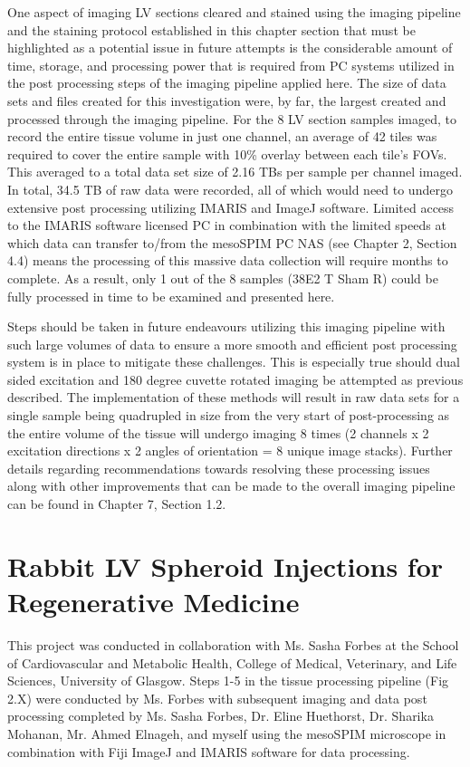 One aspect of imaging LV sections cleared and stained using the imaging pipeline and the staining protocol established in this chapter section that must be highlighted as a potential issue in future attempts is the considerable amount of time, storage, and processing power that is required from PC systems utilized in the post processing steps of the imaging pipeline applied here. The size of data sets and files created for this investigation were, by far, the largest created and processed through the imaging pipeline. For the 8 LV section samples imaged, to record the entire tissue volume in just one channel, an average of 42 tiles was required to cover the entire sample with 10\% overlay between each tile's FOVs. This averaged to a total data set size of 2.16 TBs per sample per channel imaged. In total, 34.5 TB of raw data were recorded, all of which would need to undergo extensive post processing utilizing IMARIS and ImageJ software. Limited access to the IMARIS software licensed PC in combination with the limited speeds at which data can transfer to/from the mesoSPIM PC NAS (see Chapter 2, Section 4.4) means the processing of this massive data collection will require months to complete. As a result, only 1 out of the 8 samples (38E2 T Sham R) could be fully processed in time to be examined and presented here. 

Steps should be taken in future endeavours utilizing this imaging pipeline with such large volumes of data to ensure a more smooth and efficient post processing system is in place to mitigate these challenges. This is especially true should dual sided excitation and 180 degree cuvette rotated imaging be attempted as previous described. The implementation of these methods will result in raw data sets for a single sample being quadrupled in size from the very start of post-processing as the entire volume of the tissue will undergo imaging 8 times (2 channels x 2 excitation directions x 2 angles of orientation = 8 unique image stacks). Further details regarding recommendations towards resolving these processing issues along with other improvements that can be made to the overall imaging pipeline can be found in Chapter 7, Section 1.2.



\section{Rabbit LV Spheroid Injections for Regenerative Medicine}
This project was conducted in collaboration with Ms. Sasha Forbes at the School of Cardiovascular and Metabolic Health, College of Medical, Veterinary, and Life Sciences, University of Glasgow. Steps 1-5 in the tissue processing pipeline (Fig 2.X) were conducted by Ms. Forbes with subsequent imaging and data post processing completed by Ms. Sasha Forbes, Dr. Eline Huethorst, Dr. Sharika Mohanan, Mr. Ahmed Elnageh, and myself using the mesoSPIM microscope in combination with Fiji ImageJ and IMARIS software for data processing. 

